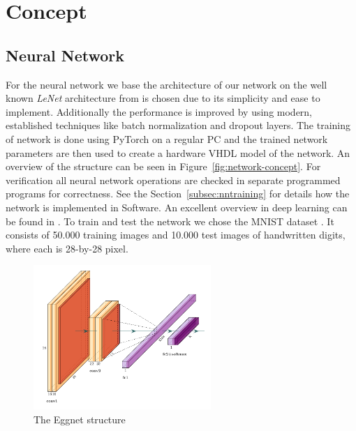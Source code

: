 \section{Concept}

\subsection{Neural Network}

For the neural network we base the architecture of our network on the well known \emph{LeNet} architecture from \cite{LeCun:1998aa} is chosen due to its simplicity and ease to implement. Additionally the performance is improved by using modern, established techniques like batch normalization \cite{Ioffe:2015aa} and dropout \cite{Srivastava:2014aa} layers. 
The training of network is done using PyTorch \cite{Paszke:2019aa} on a regular PC and the trained network parameters are then used to create a hardware VHDL model of the network. An overview of the structure can be seen in Figure~\ref{fig:network-concept}. For verification all neural network operations are checked in separate programmed programs for correctness. See the Section~\ref{subsec:nntraining} for details how the network is implemented in Software.
An excellent overview in deep learning can be found in \cite{Schmidhuber:2015aa}.
To train and test the network we chose the MNIST dataset \cite{LeCun:1998ab}. It consists of 50.000 training images and 10.000 test images of handwritten digits, where each is 28-by-28 pixel.

\begin{figure}
	\centering
	\includegraphics[width=0.6\textwidth]{img/eggnet}
	\caption{The Eggnet structure}
	\label{fig:eggnet}
\end{figure}


